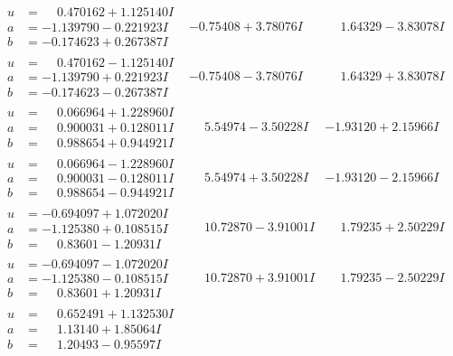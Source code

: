 \documentclass[1p]{elsarticle_modified}
\theoremstyle{definition}
\begin{document}
$$\begin{array}{c|c|c}
\begin{aligned}
u &= \phantom{-}0.470162 + 1.125140 I \\
a &= -1.139790 - 0.221923 I \\
b &= -0.174623 + 0.267387 I\end{aligned}
 & -0.75408 + 3.78076 I & \phantom{-}1.64329 - 3.83078 I \\ \hline\begin{aligned}
u &= \phantom{-}0.470162 - 1.125140 I \\
a &= -1.139790 + 0.221923 I \\
b &= -0.174623 - 0.267387 I\end{aligned}
 & -0.75408 - 3.78076 I & \phantom{-}1.64329 + 3.83078 I \\ \hline\begin{aligned}
u &= \phantom{-}0.066964 + 1.228960 I \\
a &= \phantom{-}0.900031 + 0.128011 I \\
b &= \phantom{-}0.988654 + 0.944921 I\end{aligned}
 & \phantom{-}5.54974 - 3.50228 I & -1.93120 + 2.15966 I \\ \hline\begin{aligned}
u &= \phantom{-}0.066964 - 1.228960 I \\
a &= \phantom{-}0.900031 - 0.128011 I \\
b &= \phantom{-}0.988654 - 0.944921 I\end{aligned}
 & \phantom{-}5.54974 + 3.50228 I & -1.93120 - 2.15966 I \\ \hline\begin{aligned}
u &= -0.694097 + 1.072020 I \\
a &= -1.125380 + 0.108515 I \\
b &= \phantom{-}0.83601 - 1.20931 I\end{aligned}
 & \phantom{-}10.72870 - 3.91001 I & \phantom{-}1.79235 + 2.50229 I \\ \hline\begin{aligned}
u &= -0.694097 - 1.072020 I \\
a &= -1.125380 - 0.108515 I \\
b &= \phantom{-}0.83601 + 1.20931 I\end{aligned}
 & \phantom{-}10.72870 + 3.91001 I & \phantom{-}1.79235 - 2.50229 I \\ \hline\begin{aligned}
u &= \phantom{-}0.652491 + 1.132530 I \\
a &= \phantom{-}1.13140 + 1.85064 I \\
b &= \phantom{-}1.20493 - 0.95597 I\end{aligned}

\end{array}$$
\end{document}
